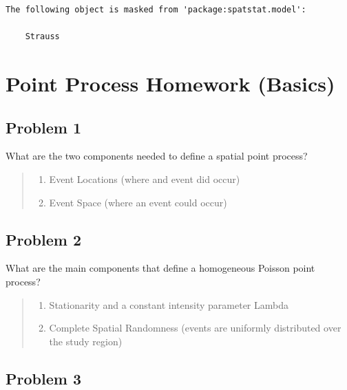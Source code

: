 \documentclass[
  letterpaper,
  DIV=11,
  numbers=noendperiod]{scrartcl}
\providecommand{\tightlist}{%
  \setlength{\itemsep}{0pt}\setlength{\parskip}{0pt}}\usepackage{longtable,booktabs,array}
\begin{document}
\begin{verbatim}
The following object is masked from 'package:spatstat.model':

    Strauss
\end{verbatim}

\hypertarget{point-process-homework-basics}{%
\section{Point Process Homework
(Basics)}\label{point-process-homework-basics}}

\hypertarget{problem-1}{%
\subsection{Problem 1}\label{problem-1}}

What are the two components needed to define a spatial point process?

\begin{quote}
\begin{enumerate}
\def\labelenumi{\arabic{enumi}.}
\tightlist
\item
  Event Locations (where and event did occur)
\item
  Event Space (where an event could occur)
\end{enumerate}
\end{quote}

\hypertarget{problem-2}{%
\subsection{Problem 2}\label{problem-2}}

What are the main components that define a homogeneous Poisson point
process?

\begin{quote}
\begin{enumerate}
\def\labelenumi{\arabic{enumi}.}
\tightlist
\item
  Stationarity and a constant intensity parameter Lambda
\item
  Complete Spatial Randomness (events are uniformly distributed over the
  study region)
\end{enumerate}
\end{quote}

\hypertarget{problem-3}{%
\subsection{Problem 3}\label{problem-3}}
\end{document}
